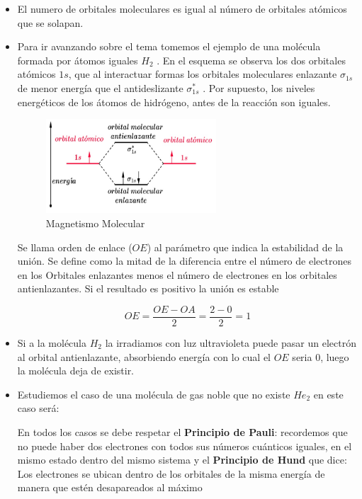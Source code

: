 \begin{itemize}
	\item El numero de orbitales moleculares es igual al número de orbitales atómicos que se solapan. 		
	\item Para ir avanzando sobre el tema tomemos el ejemplo de una molécula formada por átomos iguales $H_{2}$ . En el esquema se observa los dos orbitales atómicos $1s$, que al interactuar formas los orbitales moleculares enlazante $\sigma_{1s}$ de menor energía que el antideslizante $\sigma_{1s}^{*}$ . Por supuesto, los niveles energéticos de los átomos de hidrógeno, antes de la reacción son iguales.
	
\begin{figure}[H]
    \centering
    \includegraphics[width=0.6\textwidth]{./Figures/MagMolecular}
	\caption{Magnetismo Molecular}
	\label{fig:MagMolecular}
\end{figure}

Se llama orden de enlace ($OE$) al parámetro que indica la estabilidad de la unión. Se define como la mitad de la diferencia entre el número de electrones en los Orbitales enlazantes menos el número de electrones en los orbitales antienlazantes. Si el resultado es positivo la unión es estable

\begin{equation}
	OE=\frac{OE-OA}{2}=\frac{2-0}{2}=1
\end{equation}
	
	
	\item Si a la molécula $H_{2}$ la irradiamos con luz ultravioleta puede pasar un electrón al orbital antienlazante, absorbiendo energía con lo cual el $OE$ seria 0, luego la molécula deja de existir.
	
	\item Estudiemos el caso de una molécula de gas noble que no existe $He_{2}$ en este caso será:

En todos los casos se debe respetar el \textbf{Principio de Pauli}: recordemos que no puede haber dos electrones con todos sus números cuánticos iguales, en el mismo estado dentro del mismo sistema y el \textbf{Principio de Hund} que dice: Los electrones se ubican dentro de los orbitales de la misma energía de manera que estén desapareados al máximo


\end{itemize}
